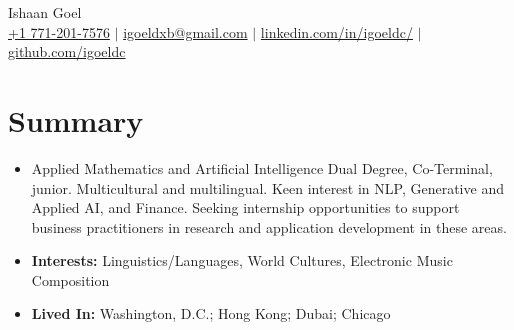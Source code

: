 \documentclass[letterpaper,10pt]{article}
\newcommand\indentsize{10pt}
\newcommand{\resumeSubHeadingListStart}{\begin{itemize}[leftmargin=0.15in, label=]}
\newcommand{\resumeSubHeadingListEnd}{\end{itemize}}
\begin{document}

\begin{center}
    \Huge Ishaan Goel \\ \vspace{2pt}
    \large
    \href{tel:17712017576}{+1 771-201-7576}
    $|$ \href{mailto:igoeldxb@gmail.com}{igoeldxb@gmail.com}
    $|$ \href{https://linkedin.com/in/igoeldc/}{linkedin.com/in/igoeldc/}
    $|$ \href{https://github.com/igoeldc}{github.com/igoeldc}
\end{center}

\vspace{-15pt}
\section{Summary}
  \resumeSubHeadingListStart
    \item{Applied Mathematics and Artificial Intelligence Dual Degree, Co-Terminal, junior. Multicultural and multilingual. Keen interest in NLP, Generative and Applied AI, and Finance. Seeking internship opportunities to support business practitioners in research and application development in these areas.}\vspace{-5pt}
    \item{\textbf{Interests:} Linguistics/Languages, World Cultures, Electronic Music Composition}\vspace{-5pt}
    \item{\textbf{Lived In:} Washington, D.C.; Hong Kong; Dubai; Chicago}
  \resumeSubHeadingListEnd

\vspace{-15pt}
\newcommand{\resumeEducationHeading}[9]{
  \item
    \begin{tabular*}{0.97\textwidth}[t]{l@{\extracolsep{\fill}}r}
      \textbf{#1} {#2} & #3 \\
      \hspace{\indentsize}#4 & #5 \\
      \hspace{\indentsize}#6 & #7 \\
      \hspace{\indentsize}#8 & #9
    \end{tabular*}\vspace{-5pt}
}
\end{document}

